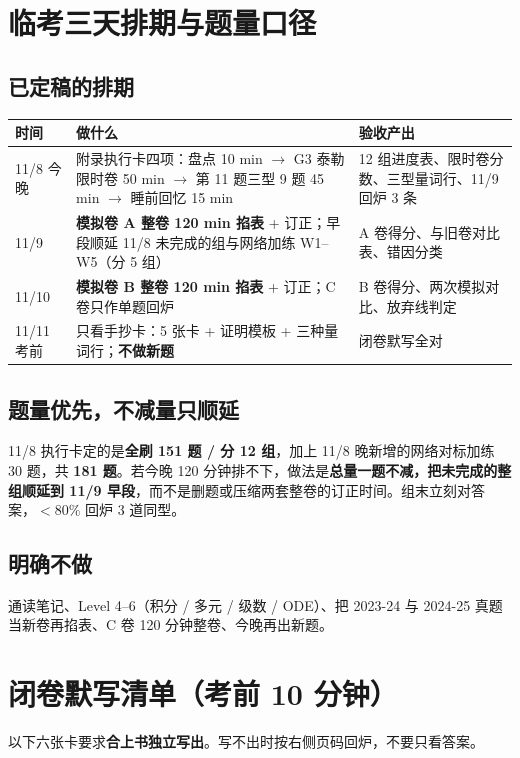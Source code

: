 \documentclass[11pt,a4paper]{ctexart}
\newcommand{\key}[1]{\textbf{#1}}
\begin{document}
\newpage
\section{临考三天排期与题量口径}

\subsection{已定稿的排期}
\begin{longtable}{@{}p{2.1cm}p{5.0cm}p{7.9cm}@{}}
\toprule
\textbf{时间} & \textbf{做什么} & \textbf{验收产出} \\
\midrule
11/8 今晚 & 附录执行卡四项：盘点 10 min $\to$ G3 泰勒限时卷 50 min $\to$ 第 11 题三型 9 题 45 min $\to$ 睡前回忆 15 min & 12 组进度表、限时卷分数、三型量词行、11/9 回炉 3 条 \\
11/9 & \textbf{模拟卷 A 整卷 120 min 掐表} + 订正；早段顺延 11/8 未完成的组与网络加练 W1--W5（分 5 组） & A 卷得分、与旧卷对比表、错因分类 \\
11/10 & \textbf{模拟卷 B 整卷 120 min 掐表} + 订正；C 卷只作单题回炉 & B 卷得分、两次模拟对比、放弃线判定 \\
11/11 考前 & 只看手抄卡：5 张卡 + 证明模板 + 三种量词行；\textbf{不做新题} & 闭卷默写全对 \\
\bottomrule
\end{longtable}

\subsection{题量优先，不减量只顺延}
11/8 执行卡定的是\textbf{全刷 151 题 / 分 12 组}，加上 11/8 晚新增的网络对标加练 30 题，共 \textbf{181 题}。若今晚 120 分钟排不下，做法是\key{总量一题不减，把未完成的整组顺延到 11/9 早段}，而不是删题或压缩两套整卷的订正时间。组末立刻对答案，$<80\%$ 回炉 3 道同型。

\subsection{明确不做}
通读笔记、Level 4--6（积分 / 多元 / 级数 / ODE）、把 2023-24 与 2024-25 真题当新卷再掐表、C 卷 120 分钟整卷、今晚再出新题。

\newpage
\section{闭卷默写清单（考前 10 分钟）}

\noindent 以下六张卡要求\textbf{合上书独立写出}。写不出时按右侧页码回炉，不要只看答案。
\end{document}
